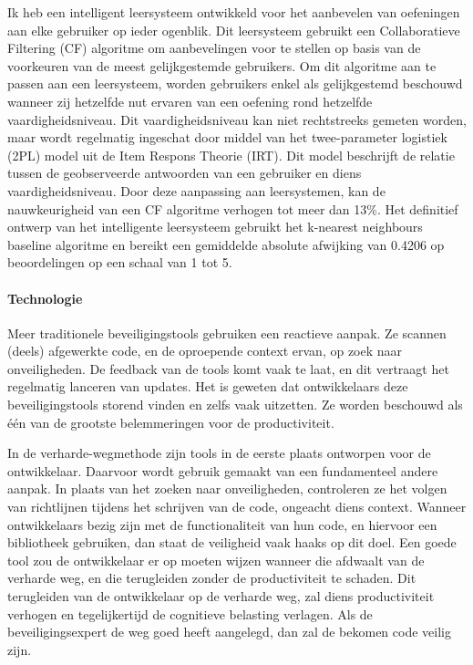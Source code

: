 Ik heb een intelligent leersysteem ontwikkeld voor het aanbevelen van oefeningen aan elke gebruiker op ieder ogenblik.
Dit leersysteem gebruikt een Collaboratieve Filtering (CF) algoritme om aanbevelingen voor te stellen op basis van de voorkeuren van de meest gelijkgestemde gebruikers.
Om dit algoritme aan te passen aan een leersysteem, worden gebruikers enkel als gelijkgestemd beschouwd wanneer zij hetzelfde nut ervaren van een oefening rond hetzelfde vaardigheidsniveau.
Dit vaardigheidsniveau kan niet rechtstreeks gemeten worden, maar wordt regelmatig ingeschat door middel van het twee-parameter logistiek (2PL) model uit de Item Respons Theorie (IRT).
Dit model beschrijft de relatie tussen de geobserveerde antwoorden van een gebruiker en diens vaardigheidsniveau.
Door deze aanpassing aan leersystemen, kan de nauwkeurigheid van een CF algoritme verhogen tot meer dan 13\%.
Het definitief ontwerp van het intelligente leersysteem gebruikt het k-nearest neighbours baseline algoritme en bereikt een gemiddelde absolute afwijking van 0.4206 op beoordelingen op een schaal van 1 tot 5.

\paragraph{Technologie}
Meer traditionele beveiligingstools gebruiken een reactieve aanpak. Ze scannen (deels) afgewerkte code, en de oproepende context ervan, op zoek naar onveiligheden.
De feedback van de tools komt vaak te laat, en dit vertraagt het regelmatig lanceren van updates.
Het is geweten dat ontwikkelaars deze beveiligingstools storend vinden en zelfs vaak uitzetten.
Ze worden beschouwd als één van de grootste belemmeringen voor de productiviteit.

In de verharde-wegmethode zijn tools in de eerste plaats ontworpen voor de ontwikkelaar.
Daarvoor wordt gebruik gemaakt van een fundamenteel andere aanpak.
In plaats van het zoeken naar onveiligheden, controleren ze het volgen van richtlijnen tijdens het schrijven van de code, ongeacht diens context.
Wanneer ontwikkelaars bezig zijn met de functionaliteit van hun code, en hiervoor een bibliotheek gebruiken, dan staat de veiligheid vaak haaks op dit doel.
Een goede tool zou de ontwikkelaar er op moeten wijzen wanneer die afdwaalt van de verharde weg, en die terugleiden zonder de productiviteit te schaden.
Dit terugleiden van de ontwikkelaar op de verharde weg, zal diens productiviteit verhogen en tegelijkertijd de cognitieve belasting verlagen.
Als de beveiligingsexpert de weg goed heeft aangelegd, dan zal de bekomen code veilig zijn.

